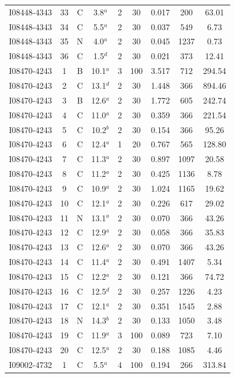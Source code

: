 \begin{table}
\begin{tabular}{ccccccccc}
I08448-4343 & 33 & C & 3.8$^{a}$ & 2 & 30 & 0.017 & 200 & 63.01 \\
I08448-4343 & 34 & C & 5.5$^{a}$ & 2 & 30 & 0.037 & 549 & 6.73 \\
I08448-4343 & 35 & N & 4.0$^{a}$ & 2 & 30 & 0.045 & 1237 & 0.73 \\
I08448-4343 & 36 & C & 1.5$^{d}$ & 2 & 30 & 0.021 & 373 & 12.41 \\
I08470-4243 & 1 & B & 10.1$^{a}$ & 3 & 100 & 3.517 & 712 & 294.54 \\
I08470-4243 & 2 & C & 13.1$^{d}$ & 2 & 30 & 1.448 & 366 & 894.46 \\
I08470-4243 & 3 & B & 12.6$^{a}$ & 2 & 30 & 1.772 & 605 & 242.74 \\
I08470-4243 & 4 & C & 11.0$^{a}$ & 2 & 30 & 0.359 & 366 & 221.54 \\
I08470-4243 & 5 & C & 10.2$^{b}$ & 2 & 30 & 0.154 & 366 & 95.26 \\
I08470-4243 & 6 & C & 12.4$^{a}$ & 1 & 20 & 0.767 & 565 & 128.80 \\
I08470-4243 & 7 & C & 11.3$^{a}$ & 2 & 30 & 0.897 & 1097 & 20.58 \\
I08470-4243 & 8 & C & 11.2$^{a}$ & 2 & 30 & 0.425 & 1136 & 8.78 \\
I08470-4243 & 9 & C & 10.9$^{a}$ & 2 & 30 & 1.024 & 1165 & 19.62 \\
I08470-4243 & 10 & C & 12.1$^{a}$ & 2 & 30 & 0.226 & 617 & 29.02 \\
I08470-4243 & 11 & N & 13.1$^{a}$ & 2 & 30 & 0.070 & 366 & 43.26 \\
I08470-4243 & 12 & C & 12.9$^{a}$ & 2 & 30 & 0.058 & 366 & 35.83 \\
I08470-4243 & 13 & C & 12.6$^{a}$ & 2 & 30 & 0.070 & 366 & 43.26 \\
I08470-4243 & 14 & C & 11.4$^{a}$ & 2 & 30 & 0.491 & 1407 & 5.34 \\
I08470-4243 & 15 & C & 12.2$^{a}$ & 2 & 30 & 0.121 & 366 & 74.72 \\
I08470-4243 & 16 & C & 12.5$^{d}$ & 2 & 30 & 0.257 & 1226 & 4.23 \\
I08470-4243 & 17 & C & 12.1$^{a}$ & 2 & 30 & 0.351 & 1545 & 2.88 \\
I08470-4243 & 18 & N & 14.3$^{b}$ & 2 & 30 & 0.133 & 1050 & 3.48 \\
I08470-4243 & 19 & C & 11.9$^{a}$ & 3 & 100 & 0.089 & 723 & 7.10 \\
I08470-4243 & 20 & C & 12.5$^{a}$ & 2 & 30 & 0.188 & 1085 & 4.46 \\
I09002-4732 & 1 & C & 5.5$^{a}$ & 4 & 100 & 0.194 & 266 & 313.84 \\

\end{tabular}
\end{table}
